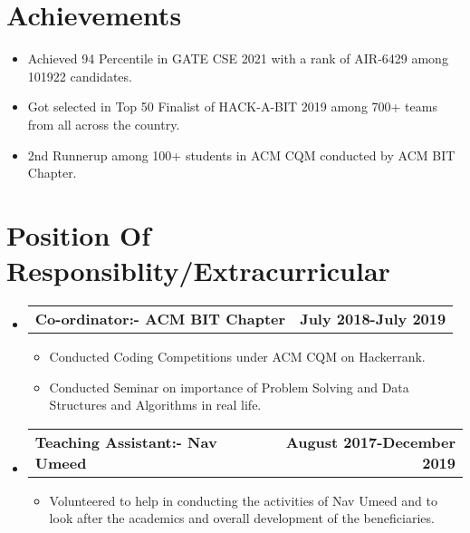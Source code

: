 \documentclass[letterpaper,11pt]{article}
\makeatletter
\newcommand{\resumeItem}[1]{
  \item\small{
    {#1 \vspace{-2pt}}
  }
}
\newcommand{\resumeProjectHeading}[2]{
    \item
    \begin{tabular*}{1.001\textwidth}{l@{\extracolsep{\fill}}r}
      \small#1 & \textbf{\small #2}\\
    \end{tabular*}\vspace{-7pt}
}
\newcommand{\resumeSubHeadingListStart}{\begin{itemize}[leftmargin=0.0in, label={}]}
\newcommand{\resumeSubHeadingListEnd}{\end{itemize}}
\newcommand{\resumeItemListStart}{\begin{itemize}}
\newcommand{\resumeItemListEnd}{\end{itemize}\vspace{-5pt}}
\makeatother
\begin{document}
%

\section{Achievements}
    \resumeSubHeadingListStart
            \resumeItemListStart
                \resumeItem{Achieved 94 Percentile in GATE CSE 2021 with a rank of AIR-6429 among 101922 candidates.}
                \resumeItem{Got selected in Top 50 Finalist of HACK-A-BIT 2019 among 700+ teams from all across the country.}
                \resumeItem{2nd Runnerup among 100+ students in ACM CQM conducted by ACM BIT Chapter.}
            \resumeItemListEnd
        
    \resumeSubHeadingListEnd
    \vspace{-20pt}

\section{Position Of Responsiblity/Extracurricular}
    \vspace{-5pt}
    \resumeSubHeadingListStart
      \resumeProjectHeading
          {\textbf{Co-ordinator:- ACM BIT Chapter}}{July 2018-July 2019}
          \resumeItemListStart
            \resumeItem{Conducted Coding Competitions under ACM CQM on Hackerrank.}
            \resumeItem{Conducted Seminar on importance of Problem Solving and Data Structures and Algorithms in real life.}
           
          \resumeItemListEnd
          \vspace{-18pt}
          
        \resumeProjectHeading
          {\textbf{Teaching Assistant:- Nav Umeed}}{August 2017-December 2019}
          \resumeItemListStart
            \resumeItem{Volunteered to help in conducting the activities of Nav Umeed and to look after the academics and overall development of the beneficiaries.}
          \resumeItemListEnd
          \vspace{-13pt}
          
    \resumeSubHeadingListEnd
\vspace{-15pt}


%
\end{document}

